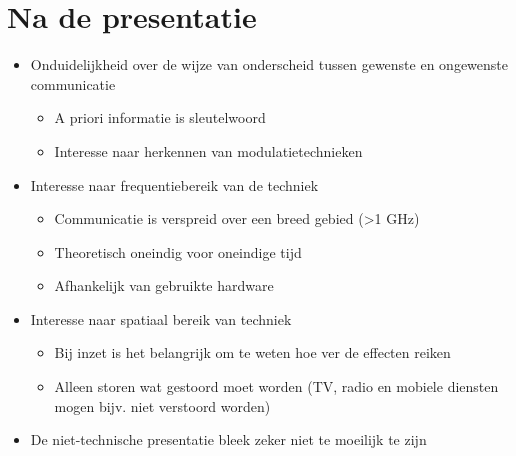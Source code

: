 \documentclass[12pt, a4paper]{article}
\begin{document}
\section{Na de presentatie}
\begin{itemize}
    \item Onduidelijkheid over de wijze van onderscheid tussen gewenste en ongewenste communicatie
    \begin{itemize}
        \item A priori informatie is sleutelwoord
        \item Interesse naar herkennen van modulatietechnieken
    \end{itemize}

    \item Interesse naar frequentiebereik van de techniek
    \begin{itemize}
        \item Communicatie is verspreid over een breed gebied (>1 GHz)
        \item Theoretisch oneindig voor oneindige tijd
        \item Afhankelijk van gebruikte hardware
    \end{itemize}

    \item Interesse naar spatiaal bereik van techniek
    \begin{itemize}
        \item Bij inzet is het belangrijk om te weten hoe ver de effecten reiken
        \item Alleen storen wat gestoord moet worden (TV, radio en mobiele diensten mogen bijv. niet verstoord worden)
    \end{itemize}

    \item De niet-technische presentatie bleek zeker niet te moeilijk te zijn
\end{itemize}
\end{document}
